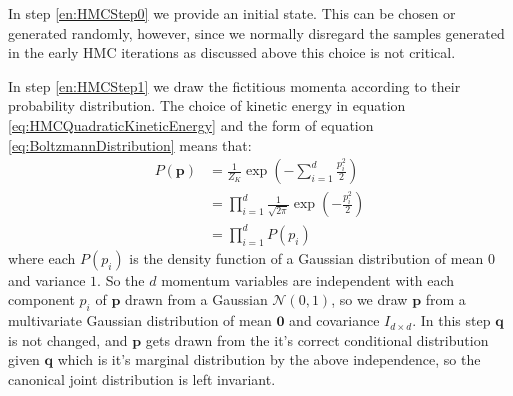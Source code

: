 \documentclass[12pt]{article}
\begin{document}
            In step \ref{en:HMCStep0} we provide an initial state. This can be chosen or generated randomly, however, since we normally disregard the samples generated in the early HMC iterations as discussed above this choice is not critical. 

            In step \ref{en:HMCStep1} we draw the fictitious momenta according to their probability distribution. The choice of kinetic energy in equation \ref{eq:HMCQuadraticKineticEnergy} and the form of equation \ref{eq:BoltzmannDistribution} means that:
            \begin{align}
                \label{eq:KineticBoltzmannDistribution}
                P\left(\bm{p}\right) & = \frac{1}{Z_K}\exp{\left(-\sum_{i=1}^{d}\frac{p_i^2}{2}\right)} \\
                                     & = \prod_{i=1}^d\frac{1}{\sqrt{2\pi}} \exp{\left(-\frac{p_i^2}{2}\right)} \\
                                     & = \prod_{i=1}^dP\left(p_i\right)
            \end{align}
            where each $P\left(p_i\right)$ is the density function of a Gaussian distribution of mean $0$ and variance $1$. So the $d$ momentum variables are independent with each component $p_i$ of $\bm{p}$ drawn from a Gaussian $\mathcal{N}{\left(0,1\right)}$, so we draw $\bm{p}$ from a multivariate Gaussian distribution of mean $\bm{0}$ and covariance $I_{d\times d}$. In this step $\bm{q}$ is not changed, and $\bm{p}$ gets drawn from the it's correct conditional distribution given $\bm{q}$ which is it's marginal distribution by the above independence, so the canonical joint distribution is left invariant.
\end{document}
